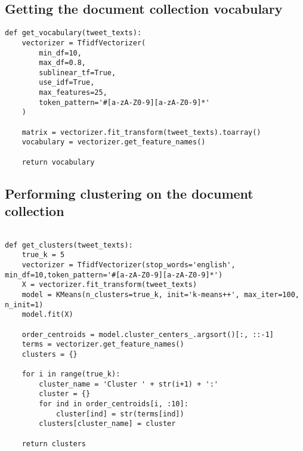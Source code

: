 \subsection{Getting the document collection vocabulary}
\begin{lstlisting}
def get_vocabulary(tweet_texts):
    vectorizer = TfidfVectorizer(
        min_df=10,
        max_df=0.8,
        sublinear_tf=True,
        use_idf=True,
        max_features=25,
        token_pattern='#[a-zA-Z0-9][a-zA-Z0-9]*'
    )

    matrix = vectorizer.fit_transform(tweet_texts).toarray()
    vocabulary = vectorizer.get_feature_names()

    return vocabulary
\end{lstlisting}
\subsection{Performing clustering on the document collection}
\begin{lstlisting}

def get_clusters(tweet_texts):
    true_k = 5
    vectorizer = TfidfVectorizer(stop_words='english', min_df=10,token_pattern='#[a-zA-Z0-9][a-zA-Z0-9]*')
    X = vectorizer.fit_transform(tweet_texts)
    model = KMeans(n_clusters=true_k, init='k-means++', max_iter=100, n_init=1)
    model.fit(X)

    order_centroids = model.cluster_centers_.argsort()[:, ::-1]
    terms = vectorizer.get_feature_names()
    clusters = {}

    for i in range(true_k):
        cluster_name = 'Cluster ' + str(i+1) + ':'
        cluster = {}
        for ind in order_centroids[i, :10]:
            cluster[ind] = str(terms[ind])
        clusters[cluster_name] = cluster

    return clusters
\end{lstlisting}

